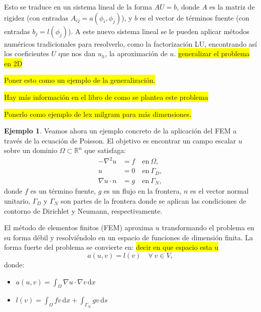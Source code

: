 \documentclass[a4paper,11pt,spanish, twoside, leqno]{tfg-uam}
\theoremstyle{definition}
\newtheorem{exmp}[teor]{Ejemplo}
\begin{document}
Esto se traduce en un sistema lineal de la forma $AU = b$, donde $A$ es la matriz de rigidez (con entradas $A_{ij}=a\left( \phi_i,\phi_j\right)$), y $b$ es el vector de términos fuente (con entradas $b_j = l(\phi_j)$). A este nuevo sistema lineal se le pueden aplicar métodos numéricos tradicionales para resolverlo, como la factorización LU, encontrando así los coeficientes $U$ que nos dan $u_h$, la aproximación de $u$.
\colorbox{yellow}{generalizar el problema en 2D}
\begin{mdframed} 
    \colorbox{yellow}{Poner esto como un ejemplo de la generalización. }
    
    \colorbox{yellow}{Hay más información en el libro de como se plantea este  problema}

    \colorbox{yellow}{Ponerlo como ejemplo de lex milgram para más dimensiones.}
\begin{exmp}
    Veamos ahora un ejemplo concreto de la aplicación del FEM a través de la ecuación de Poisson. El objetivo es encontrar un campo escalar $ u $ sobre un dominio $\Omega \subset \mathbb{R}^n$ que satisfaga:
    \begin{equation}
    \begin{aligned}
    - \nabla^2 u &= f \quad \text{en} \ \Omega, \\
    u &= 0 \quad \text{en} \ \Gamma_D, \\
    \nabla u \cdot n &= g \quad \text{en} \ \Gamma_N,
    \end{aligned}
    \end{equation}
    donde $ f $ es un término fuente, $ g $ es un flujo en la frontera, $ n $ es el vector normal unitario, $\Gamma_D$ y $\Gamma_N$ son partes de la frontera donde se aplican las condiciones de contorno de Dirichlet y Neumann, respectivamente.

    El método de elementos finitos (FEM) aproxima $ u $ transformando el problema en su forma débil y resolviéndolo en un espacio de funciones de dimensión finita. La forma fuerte del problema se convierte en: \colorbox{yellow}{decir en que espacio esta u}
    \begin{equation}
    a(u, v) = l(v) \quad \forall \ v \in V,
    \end{equation}
    donde:
    \begin{itemize}
        \item $ a(u, v) = \int_{\Omega} \nabla u \cdot \nabla v \, \text{d}x $
        \item $ l(v) = \int_{\Omega} f v \, \text{d}x + \int_{\Gamma_N} g v \, \text{d}s $
    \end{itemize}


\end{exmp}
\end{mdframed}
\end{document}
